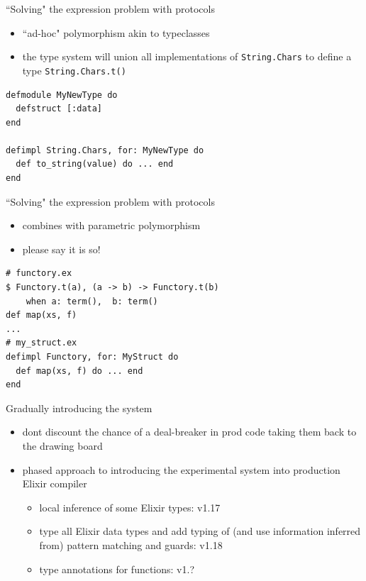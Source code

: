 \documentclass[
  ignorenonframetext,
  aspectratio=169]{beamer}
\newcommand{\passthrough}[1]{#1}
\providecommand{\tightlist}{%
  \setlength{\itemsep}{0pt}\setlength{\parskip}{0pt}}
\begin{document}
\begin{frame}[fragile]{``Solving" the expression problem with protocols}
\label{solving-the-expression-problem-with-protocols}
\begin{itemize}
\tightlist
\item
  ``ad-hoc" polymorphism akin to typeclasses
\item
  the type system will union all implementations of
  \passthrough{\lstinline!String.Chars!} to define a type
  \passthrough{\lstinline!String.Chars.t()!}
\end{itemize}

\begin{lstlisting}
defmodule MyNewType do
  defstruct [:data]
end

defimpl String.Chars, for: MyNewType do
  def to_string(value) do ... end
end
\end{lstlisting}
\end{frame}

\begin{frame}[fragile]{``Solving" the expression problem with protocols}
\label{solving-the-expression-problem-with-protocols-1}
\begin{itemize}
\tightlist
\item
  combines with parametric polymorphism
\item
  please say it is so!
\end{itemize}

\begin{lstlisting}
# functory.ex
$ Functory.t(a), (a -> b) -> Functory.t(b)
    when a: term(),  b: term()
def map(xs, f)
...
# my_struct.ex
defimpl Functory, for: MyStruct do
  def map(xs, f) do ... end
end
\end{lstlisting}
\end{frame}

\begin{frame}{Gradually introducing the system}
\label{gradually-introducing-the-system}
\begin{itemize}
\tightlist
\item
  don\textquotesingle t discount the chance of a deal-breaker in prod
  code taking them back to the drawing board
\item
  phased approach to introducing the experimental system into production
  Elixir compiler

  \begin{itemize}
  \tightlist
  \item
    local inference of some Elixir types: v1.17
  \item
    type all Elixir data types and add typing of (and use information
    inferred from) pattern matching and guards: v1.18
  \item
    type annotations for functions: v1.?
  \end{itemize}
\end{itemize}
\end{frame}
\end{document}
